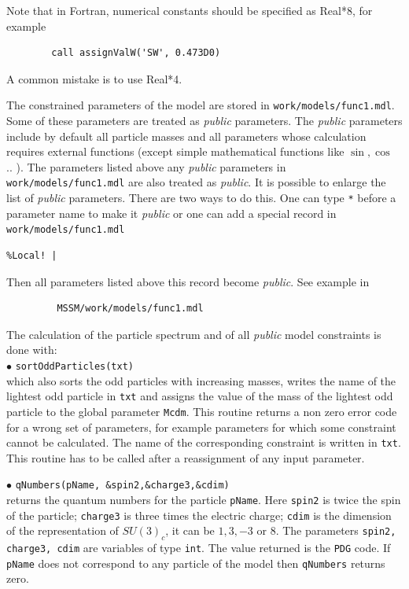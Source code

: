 \documentclass[12pt,a4paper]{article}
\begin{document}
Note that in  Fortran, numerical constants should be specified as  Real*8, for example
\begin{verbatim}     
        call assignValW('SW', 0.473D0) 
\end{verbatim}
A common mistake is to use Real*4.  


The constrained parameters of the model are stored in \verb|work/models/func1.mdl|. Some of
these parameters are treated as {\it public} parameters. The {\it public} parameters include 
by default all particle masses 
and all parameters  whose calculation requires external functions (except simple
mathematical functions like $\sin,\cos$ .. ). The parameters
listed above any {\it public} parameters in  \verb|work/models/func1.mdl|
are also treated as {\it public}. 
It is possible to enlarge the list of {\it public} parameters. There are two ways to do this. 
One can type \verb|*| before a parameter name to make it {\it public} or one 
can add a  special record in \verb|work/models/func1.mdl|
\begin{verbatim}
%Local! |   
\end{verbatim}
Then all parameters listed above this record  become {\it public}. 
See example in
\begin{verbatim} 
         MSSM/work/models/func1.mdl 
\end{verbatim}

The calculation of the particle spectrum and of all  {\it public} model constraints 
is  done with:\\
\noindent
 $\bullet$ \verb|sortOddParticles(txt)|\\
which also sorts the odd
particles with increasing  masses,  writes the name of the lightest odd particle 
in \verb|txt| and    assigns  the value of the mass  of
the lightest odd particle to the global parameter \verb|Mcdm|.
This routine returns a non zero error code for a
wrong set of parameters, for example parameters  for which some
constraint cannot be calculated.
The name of the corresponding constraint is
written in \verb|txt|. This routine has to be called after a reassignment of any input parameter.

\noindent 
$\bullet$ \verb|qNumbers(pName, &spin2,&charge3,&cdim)|\\
returns the quantum numbers for the particle \verb|pName|. Here \verb|spin2| is twice the spin of the particle; \verb|charge3| is 
three times the electric charge; \verb|cdim| is the  dimension of the representation
of $SU(3)_c$, it can be $1,3,-3$ or $8$. The parameters {\tt spin2, charge3, cdim} are 
variables of type {\tt int}. The value returned 
is the {\tt PDG} code. If \verb|pName| does not correspond to any
particle of the model then \verb|qNumbers| returns zero.
\end{document}
